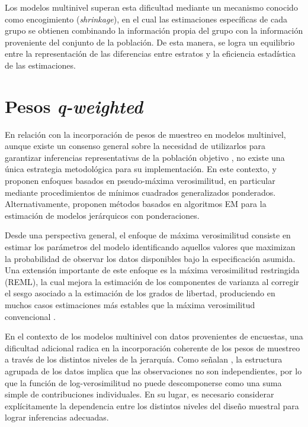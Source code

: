 \documentclass[
  spanish,
  12pt,
]{book}
\begin{document}
Los modelos multinivel superan esta dificultad mediante un mecanismo conocido como encogimiento (\emph{shrinkage}), en el cual las estimaciones específicas de cada grupo se obtienen combinando la información propia del grupo con la información proveniente del conjunto de la población. De esta manera, se logra un equilibrio entre la representación de las diferencias entre estratos y la eficiencia estadística de las estimaciones.

\section{\texorpdfstring{Pesos \emph{q-weighted}}{Pesos q-weighted}}\label{pesos-q-weighted}

En relación con la incorporación de pesos de muestreo en modelos multinivel, aunque existe un consenso general sobre la necesidad de utilizarlos para garantizar inferencias representativas de la población objetivo \citep{cai2013investigation}, no existe una única estrategia metodológica para su implementación. En este contexto, \citet{pfeffermann1998weighting} y \citet{asparouhov2006general} proponen enfoques basados en pseudo-máxima verosimilitud, en particular mediante procedimientos de mínimos cuadrados generalizados ponderados. Alternativamente, \citet{rabehesketh2006multilevel} proponen métodos basados en algoritmos EM para la estimación de modelos jerárquicos con ponderaciones.

Desde una perspectiva general, el enfoque de máxima verosimilitud consiste en estimar los parámetros del modelo identificando aquellos valores que maximizan la probabilidad de observar los datos disponibles bajo la especificación asumida. Una extensión importante de este enfoque es la máxima verosimilitud restringida (REML), la cual mejora la estimación de los componentes de varianza al corregir el sesgo asociado a la estimación de los grados de libertad, produciendo en muchos casos estimaciones más estables que la máxima verosimilitud convencional \citep{kreft1998introducing}.

En el contexto de los modelos multinivel con datos provenientes de encuestas, una dificultad adicional radica en la incorporación coherente de los pesos de muestreo a través de los distintos niveles de la jerarquía. Como señalan \citet{pfeffermann1998weighting}, la estructura agrupada de los datos implica que las observaciones no son independientes, por lo que la función de log-verosimilitud no puede descomponerse como una suma simple de contribuciones individuales. En su lugar, es necesario considerar explícitamente la dependencia entre los distintos niveles del diseño muestral para lograr inferencias adecuadas.
\end{document}

